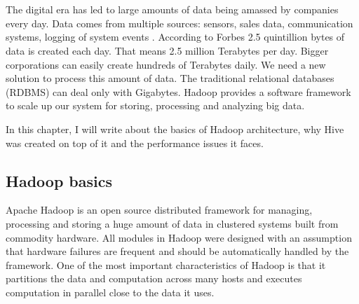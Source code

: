 \chapter{\bevezetes}

The digital era has led to large amounts of data being amassed by companies every day. Data comes from multiple sources: sensors, sales data, communication systems, logging of system events \etc. According to Forbes \cite{Forbes} 2.5 quintillion bytes of data is created each day. That means 2.5 million Terabytes per day. Bigger corporations can easily create hundreds of Terabytes daily. We need a new solution to process this amount of data. The traditional relational databases (RDBMS) can deal only with Gigabytes. Hadoop provides a software framework to scale up our system for storing, processing and analyzing big data.

In this chapter, I will write about the basics of Hadoop architecture, why Hive was created on top of it and the performance issues it faces.

\section{Hadoop basics}
Apache Hadoop is an open source distributed framework for managing, processing  and storing a huge amount of data in clustered systems built from commodity hardware. All modules in Hadoop were designed with an assumption that hardware failures are frequent and should be automatically handled by the framework. One of the most important characteristics of Hadoop is that it partitions the data and computation across many hosts and executes computation in parallel close to the data it uses.  \cite{Hadoop-wiki}

